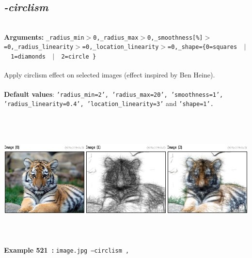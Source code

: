 \documentclass[a4paper,11pt,twoside]{book}
\begin{document}
\subsection{\emph{-circlism} }\vspace*{-0.5em}
~\\\textbf{Arguments: } 
{\small \texttt{\_radius\_min$>$0,\_radius\_max$>$0,\_smoothness[\%]$>$=0,\_radius\_linearity$>$=0,\_location\_linearity$>$=0,\_shape=\{0=squares ~$|$~ 1=diamonds ~$|$~ 2=circle \}}}\\~\\
Apply circlism effect on selected images (effect inspired by Ben Heine).
~\\~\\\textbf{Default values}: {\small \texttt{'radius\_min=2', 'radius\_max=20', 'smoothness=1', 'radius\_linearity=0.4', 'location\_linearity=3'} and \texttt{'shape=1'.}}
\begin{center}\includegraphics[keepaspectratio=true,height=7cm,width=\textwidth]{img/gmic_def521.jpg}\\
{\footnotesize \textbf{Example 521~:} \texttt{image.jpg --circlism ,}}
\end{center}
\end{document}
